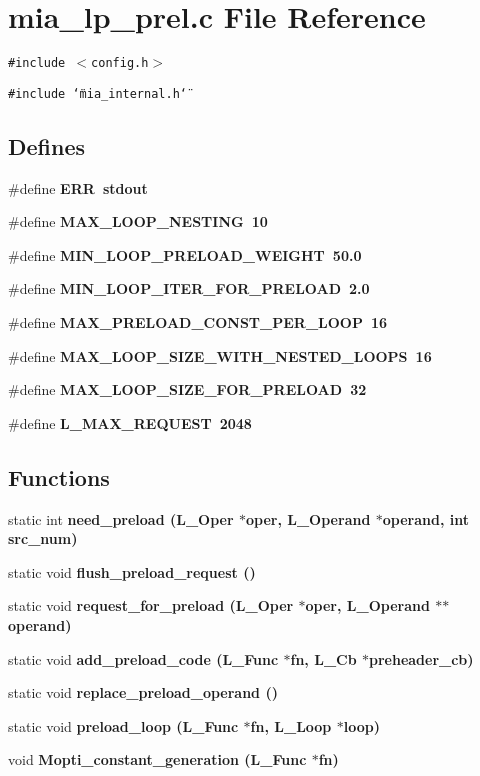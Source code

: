 \section{mia\_\-lp\_\-prel.c File Reference}
\label{mia__lp__prel_8c}
{\tt \#include $<$config.h$>$}\par
{\tt \#include \char`\"{}mia\_\-internal.h\char`\"{}}\par
\subsection*{Defines}
\begin{CompactItemize}
\item 
\#define \bf{ERR}~stdout
\item 
\#define \bf{MAX\_\-LOOP\_\-NESTING}~10
\item 
\#define \bf{MIN\_\-LOOP\_\-PRELOAD\_\-WEIGHT}~50.0
\item 
\#define \bf{MIN\_\-LOOP\_\-ITER\_\-FOR\_\-PRELOAD}~2.0
\item 
\#define \bf{MAX\_\-PRELOAD\_\-CONST\_\-PER\_\-LOOP}~16
\item 
\#define \bf{MAX\_\-LOOP\_\-SIZE\_\-WITH\_\-NESTED\_\-LOOPS}~16
\item 
\#define \bf{MAX\_\-LOOP\_\-SIZE\_\-FOR\_\-PRELOAD}~32
\item 
\#define \bf{L\_\-MAX\_\-REQUEST}~2048
\end{CompactItemize}
\subsection*{Functions}
\begin{CompactItemize}
\item 
static int \bf{need\_\-preload} (L\_\-Oper $\ast$oper, L\_\-Operand $\ast$operand, int src\_\-num)
\item 
static void \bf{flush\_\-preload\_\-request} ()
\item 
static void \bf{request\_\-for\_\-preload} (L\_\-Oper $\ast$oper, L\_\-Operand $\ast$$\ast$operand)
\item 
static void \bf{add\_\-preload\_\-code} (L\_\-Func $\ast$fn, L\_\-Cb $\ast$preheader\_\-cb)
\item 
static void \bf{replace\_\-preload\_\-operand} ()
\item 
static void \bf{preload\_\-loop} (L\_\-Func $\ast$fn, L\_\-Loop $\ast$loop)
\item 
void \bf{Mopti\_\-constant\_\-generation} (L\_\-Func $\ast$fn)
\end{CompactItemize}
